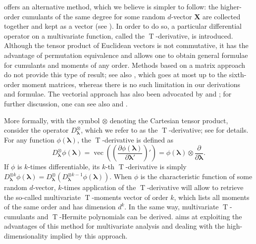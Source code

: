  offers an alternative method, which we believe is simpler to follow: the higher-order cumulants of the same degree for some random \(d\)-vector \(\mathbf{X}\) are collected together and kept as a vector (see \citet{terdik2003higher}). In order to do so, a particular differential operator on a multivariate function, called the \(\operatorname{T}\)-derivative, is introduced. Although the tensor product of Euclidean vectors is not commutative, it has the advantage of permutation equivalence and allows one to obtain general formulae for cumulants and moments of any order. Methods based on a matrix approach do not provide this type of result; see also \citet{ould2015concise}, which goes at most up to the sixth-order moment matrices, whereas there is no such limitation in our derivations and formulae. The vectorial approach has also been advocated by \citet{Holmquist96} and \citet{Chacon2014}; for further discussion, one can see also \citet{kolda2009tensor} and \citet{qi2006rank}.

More formally, with the symbol \(\otimes\) denoting the Cartesian tensor product, consider the operator \(D_{\boldsymbol{\lambda}}^{\otimes}\),
which we refer to as the
\(\operatorname{T}\)-derivative; see \citet{TerdikRaosSankhya06} for details. For any function \({\phi}(\boldsymbol{\lambda})\), the \(\operatorname{T}\)-derivative is defined as
\begin{equation}\label{Tderiv}
D_{\boldsymbol{\lambda}}^{\otimes}{{\phi}}%
(\boldsymbol{\lambda})=\operatorname{vec}\left(\left(  \frac{\partial{\phi
}(\boldsymbol{\lambda})}{\partial\boldsymbol{\lambda}'}\right)'  \right)={\phi}(\boldsymbol{\lambda})\otimes\frac{\partial}{\partial
\boldsymbol{\lambda}}.%
\end{equation}
If \({{\phi}}\) is \(k\)-times differentiable, its \(k\)-th
\(\operatorname{T}\)-derivative is simply
\(D_{\boldsymbol{\lambda}}^{\otimes k}{{\phi} }(\boldsymbol{\lambda})=D_{\boldsymbol{\lambda}}^{\otimes}\left( D_{\boldsymbol{\lambda}}^{\otimes k-1}{{\phi} }(\boldsymbol{\lambda})\right)\). When \({{\phi}}\) is the characteristic function of some random \(d\)-vector, \(k\)-times application of the \(\operatorname{T}\)-derivative will allow to retrieve the so-called multivariate \(\operatorname{T}\)-moments vector of order \(k\), which lists all moments of the same order and has dimension \(d^k\). In the same way, multivariate \(\operatorname{T}\)-cumulants and \(\operatorname{T}\)-Hermite polynomials can be derived.  aims at exploiting the advantages of this method for multivariate analysis and dealing with the high-dimensionality implied by this approach.

